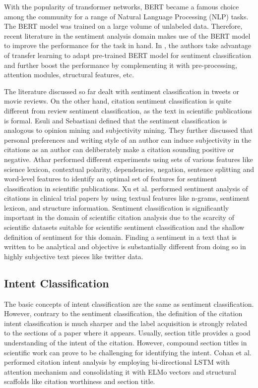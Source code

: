 \documentclass[runningheads]{llncs}
\begin{document}
With the popularity of transformer networks, BERT\cite{devlin2018bert} became a famous choice among the community for a range of Natural Language Processing (NLP) tasks. The BERT model was trained on a large volume of unlabeled data. Therefore, recent literature in the sentiment analysis domain makes use of the BERT model to improve the performance for the task in hand. In \cite{8947435,zhou2016attention,DBLP:journals/corr/abs-1904-12848}, the authors take advantage of transfer learning to adapt pre-trained BERT model for sentiment classification and further boost the performance by complementing it with pre-processing, attention modules, structural features, etc.

The literature discussed so far dealt with sentiment classification in tweets or movie reviews. On the other hand, citation sentiment classification is quite different from review sentiment classification, as the text in scientific publications is formal. Esuli and Sebastiani \cite{esuli2006determining} defined that the sentiment classification is analogous to opinion mining and subjectivity mining. They further discussed that personal preferences and writing style of an author can induce subjectivity in the citations as an author can deliberately make a citation sounding positive or negative.
Athar \cite{athar:2011:SS} performed different experiments using sets of various features like science lexicon, contextual polarity, dependencies, negation, sentence splitting and word-level features to identify an optimal set of features for sentiment classification in scientific publications. Xu et al. \cite{xu2015citation} performed sentiment analysis of citations in clinical trial papers by using textual features like n-grams, sentiment lexicon, and structure information. Sentiment classification is significantly important in the domain of scientific citation analysis due to the scarcity of scientific datasets suitable for scientific sentiment classification and the shallow definition of sentiment for this domain. Finding a sentiment in a text that is written to be analytical and objective is substantially different from doing so in highly subjective text pieces like twitter data.

\subsection{Intent Classification}
The basic concepts of intent classification are the same as sentiment classification. However, contrary to the sentiment classification, the definition of the citation intent classification is much sharper and the label acquisition is strongly related to the sections of a paper where it appears. Usually, section title provides a good understanding of the intent of the citation. However, compound section titles in scientific work can prove to be challenging for identifying the intent. Cohan et al. \cite{cohan2019structural} performed citation intent analysis by employing bi-directional LSTM with attention mechanism and consolidating it with ELMo vectors and structural scaffolds like citation worthiness and section title.
\end{document}
